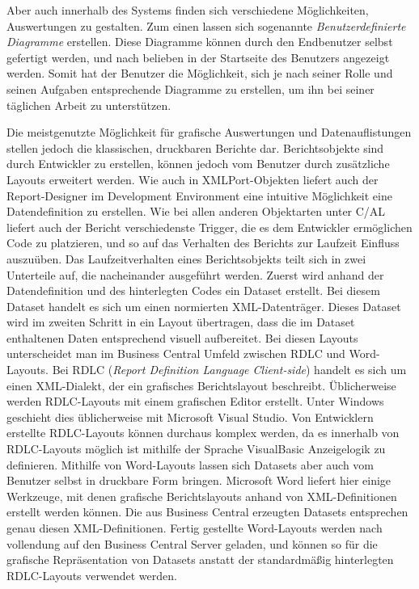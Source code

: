 Aber auch innerhalb des Systems finden sich verschiedene Möglichkeiten, Auswertungen zu gestalten. Zum einen lassen sich sogenannte \textit{Benutzerdefinierte Diagramme} erstellen. Diese Diagramme können durch den Endbenutzer selbst gefertigt werden, und nach belieben in der Startseite des Benutzers angezeigt werden. Somit hat der Benutzer die Möglichkeit, sich je nach seiner Rolle und seinen Aufgaben entsprechende Diagramme zu erstellen, um ihn bei seiner täglichen Arbeit zu unterstützen. \linebreak	

Die meistgenutzte Möglichkeit für grafische Auswertungen und Datenauflistungen stellen jedoch die klassischen, druckbaren Berichte dar. Berichtsobjekte sind durch Entwickler zu erstellen, können jedoch vom Benutzer durch zusätzliche Layouts erweitert werden. Wie auch in XMLPort-Objekten liefert auch der Report-Designer im Development Environment eine intuitive Möglichkeit eine Datendefinition zu erstellen. Wie bei allen anderen Objektarten unter C/AL liefert auch der Bericht verschiedenste Trigger, die es dem Entwickler ermöglichen Code zu platzieren, und so auf das Verhalten des Berichts zur Laufzeit Einfluss auszuüben. Das Laufzeitverhalten eines Berichtsobjekts teilt sich in zwei Unterteile auf, die nacheinander ausgeführt werden. Zuerst wird anhand der Datendefinition und des hinterlegten Codes ein Dataset erstellt. Bei diesem Dataset handelt es sich um einen normierten XML-Datenträger. Dieses Dataset wird im zweiten Schritt in ein Layout übertragen, dass die im Dataset enthaltenen Daten entsprechend visuell aufbereitet.
Bei diesen Layouts unterscheidet man im Business Central Umfeld zwischen RDLC und Word-Layouts. Bei RDLC (\textit{Report Definition Language Client-side}) handelt es sich um einen XML-Dialekt, der ein grafisches Berichtslayout beschreibt. Üblicherweise werden RDLC-Layouts mit einem grafischen Editor erstellt. Unter Windows geschieht dies üblicherweise mit Microsoft Visual Studio. Von Entwicklern erstellte RDLC-Layouts können durchaus komplex werden, da es innerhalb von RDLC-Layouts möglich ist mithilfe der Sprache VisualBasic Anzeigelogik zu definieren. Mithilfe von Word-Layouts lassen sich Datasets aber auch vom Benutzer selbst in druckbare Form bringen. Microsoft Word liefert hier einige Werkzeuge, mit denen grafische Berichtslayouts anhand von XML-Definitionen erstellt werden können. Die aus Business Central erzeugten Datasets entsprechen genau diesen XML-Definitionen. Fertig gestellte Word-Layouts werden nach vollendung auf den Business Central Server geladen, und können so für die grafische Repräsentation von Datasets anstatt der standardmäßig hinterlegten RDLC-Layouts verwendet werden.

